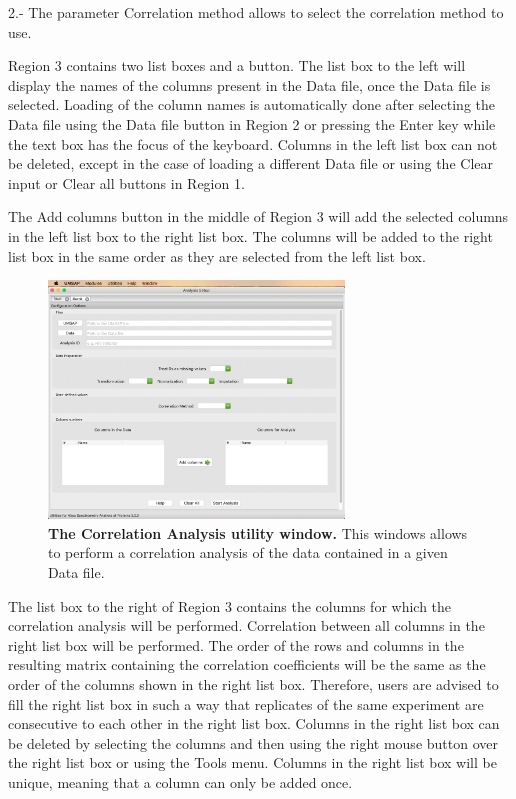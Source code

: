 \num{2}.- The parameter Correlation method allows to select the correlation method to use.

Region \num{3} contains two list boxes and a button. The list box to the left will display the names of the columns present in the Data file, once the Data file is selected. Loading of the column names is automatically done after selecting the Data file using the Data file button in Region \num{2} or pressing the Enter key while the text box has the focus of the keyboard. Columns in the left list box can not be deleted, except in the case of loading a different Data file or using the Clear input or Clear all buttons in Region \num{1}. 

The Add columns button in the middle of Region \num{3} will add the selected columns in the left list box to the right list box. The columns will be added to the right list box in the same order as they are selected from the left list box. 

\begin{figure}[h]
	\centering
	\includegraphics[width=0.7\textwidth]{./IMAGES/UTIL-CORR-WINDOW/util-corr.jpg}	    
	\caption[The Correlation Analysis utility window]{\textbf{The Correlation Analysis utility window.} This windows allows to perform a correlation analysis of the data contained in a given Data file.} 
	\label{fig:utilCorrAnalysis}
	\vspace{-5pt} 	
\end{figure}

The list box to the right of Region \num{3} contains the columns for which the correlation analysis will be performed. Correlation between all columns in the right list box will be performed. The  order of the rows and columns in the resulting matrix containing the correlation coefficients will be the same as the order of the columns shown in the right list box. Therefore, users are advised to fill the right list box in such a way that replicates of the same experiment are consecutive to each other in the right list box. Columns in the right list box can be deleted by selecting the columns and then using the right mouse button over the right list box or using the Tools menu. Columns in the right list box will be unique, meaning that a column can only be added once. 

